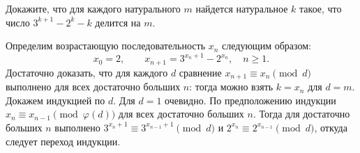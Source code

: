 Докажите, что для каждого натурального $m$ найдется натуральное $k$ такое, что
число $3^{k+1} - 2^k - k$ делится на $m$.


\solution
Определим возрастающую последовательность $x_n$ следующим образом:
\[
    x_0 = 2
,\qquad
    x_{n+1} = 3^{x_n + 1} - 2^{x_n}
,\quad
    n \geq 1
.\]
Достаточно доказать, что для каждого $d$ сравнение
$x_{n+1} \equiv x_n \pmod{d}$ выполнено для всех достаточно больших $n$:
тогда можно взять $k = x_n$ для $d = m$.
Докажем индукцией по $d$.
Для $d = 1$ очевидно.
По предположению индукции
$x_n \equiv x_{n-1} \pmod{\varphi(d)}$
для всех достаточно больших $n$.
Тогда для достаточно больших $n$ выполнено
$3^{x_n + 1} \equiv 3^{x_{n-1} + 1} \pmod d$ и
$2^{x_n} \equiv 2^{x_{n-1}} \pmod d$,
откуда следует переход индукции.



